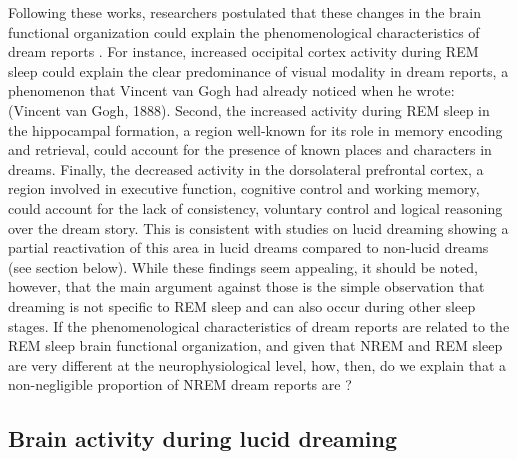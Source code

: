 Following these works, researchers postulated that these changes in the brain functional organization could explain the phenomenological characteristics of dream reports \citep{hobson_dreaming_2000, schwartz_sleep_2002, maquet_human_2005, nir_dreaming_2010, ruby_experimental_2011}. For instance, increased occipital cortex activity during REM sleep could explain the clear predominance of visual modality in dream reports, a phenomenon that Vincent van Gogh had already noticed when he wrote:  (Vincent van Gogh, 1888). Second, the increased activity during REM sleep in the hippocampal formation, a region well-known for its role in memory encoding and retrieval, could account for the presence of known places and characters in dreams. Finally, the decreased activity in the dorsolateral prefrontal cortex, a region involved in executive function, cognitive control and working memory, could account for the lack of consistency, voluntary control and logical reasoning over the dream story. This is consistent with studies on lucid dreaming showing a partial reactivation of this area in lucid dreams compared to non-lucid dreams (see section below). While these findings seem appealing, it should be noted, however, that the main argument against those is the simple observation that dreaming is not specific to REM sleep and can also occur during other sleep stages. If the phenomenological characteristics of dream reports are related to the REM sleep brain functional organization, and given that NREM and REM sleep are very different at the neurophysiological level, how, then, do we explain that a non-negligible proportion of NREM dream reports are  \citep{hobson_dreaming_1988}?

\subsection{Brain activity during lucid dreaming}
\label{sec:dream-research:attempts:ba-lucid}

